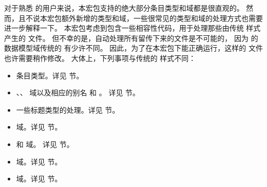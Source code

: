 对于熟悉 \BibTeX 的用户来说，本宏包支持的绝大部分条目类型和域都是很直观的。
然而，且不说本宏包额外新增的类型和域，一些很常见的类型和域的处理方式也需要进一步解释一下。
本宏包考虑到包含一些相容性代码，用于处理那些由传统 \BibTeX 样式产生的  文件。
但不幸的是，自动处理所有留传下来的文件是不可能的，
因为 \biblatex 的数据模型域传统的 \BibTeX 有少许不同。
因此，为了在本宏包下能正确运行，这样的  文件也许需要稍作修改。
大体上，下列事项与传统的 \BibTeX 样式不同：

\begin{itemize}
	\setlength{\itemsep}{0pt}
	\item {} 条目类型。详见  节。
	\item {}、、 域以及相应的别名  和 。
	详见  节。
	\item 一些标题类型的处理。详见  节。
	\item {} 域。详见  节。
	\item {} 和  域。
	详见  节。
	\item {} 域。详见  节。
	\item {} 域。详见  节。
\end{itemize}

